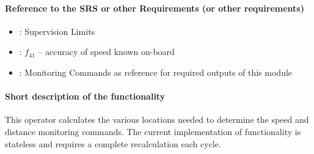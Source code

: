 \paragraph{Reference to the SRS or other Requirements (or other requirements)}
\begin{itemize}
	\item \cite[Chapt.~3.13.9]{subset-026}: Supervision Limits 
	\item \cite[Chapt.~5.3.1.2]{subset-041}: $f_{41}$ -- accuracy of speed known on-board
	\item \cite[Chapt.~3.13.10]{subset-026}: Monitoring Commands as reference for required outputs of this module
\end{itemize}

\paragraph{Short description of the functionality}
This operator calculates the various locations needed to determine the speed and distance monitoring commands. The current implementation of functionality is stateless and requires a complete recalculation each cycle.

